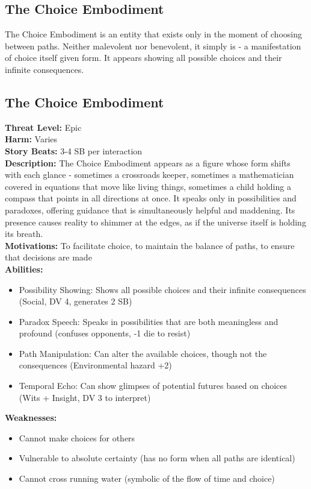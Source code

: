 \documentclass[11pt]{article}
\newenvironment{monsterentry}[1]{%
  \begin{mdframed}[backgroundcolor=shadecolor, linewidth=0pt, leftmargin=0pt, rightmargin=0pt]%
  \subsection*{#1}%
}{%
  \end{mdframed}%
}
\begin{document}
\subsection{The Choice Embodiment}

The Choice Embodiment is an entity that exists only in the moment of choosing between paths. Neither malevolent nor benevolent, it simply is - a manifestation of choice itself given form. It appears showing all possible choices and their infinite consequences.

\begin{monsterentry}{The Choice Embodiment}
\textbf{Threat Level:} Epic \\
\textbf{Harm:} Varies \\
\textbf{Story Beats:} 3-4 SB per interaction \\
\textbf{Description:} The Choice Embodiment appears as a figure whose form shifts with each glance - sometimes a crossroads keeper, sometimes a mathematician covered in equations that move like living things, sometimes a child holding a compass that points in all directions at once. It speaks only in possibilities and paradoxes, offering guidance that is simultaneously helpful and maddening. Its presence causes reality to shimmer at the edges, as if the universe itself is holding its breath. \\
\textbf{Motivations:} To facilitate choice, to maintain the balance of paths, to ensure that decisions are made \\
\textbf{Abilities:}
\begin{itemize}
    \item Possibility Showing: Shows all possible choices and their infinite consequences (Social, DV 4, generates 2 SB)
    \item Paradox Speech: Speaks in possibilities that are both meaningless and profound (confuses opponents, -1 die to resist)
    \item Path Manipulation: Can alter the available choices, though not the consequences (Environmental hazard +2)
    \item Temporal Echo: Can show glimpses of potential futures based on choices (Wits + Insight, DV 3 to interpret)
\end{itemize}
\textbf{Weaknesses:}
\begin{itemize}
    \item Cannot make choices for others
    \item Vulnerable to absolute certainty (has no form when all paths are identical)
    \item Cannot cross running water (symbolic of the flow of time and choice)

\end{itemize}
\end{monsterentry}
\end{document}
